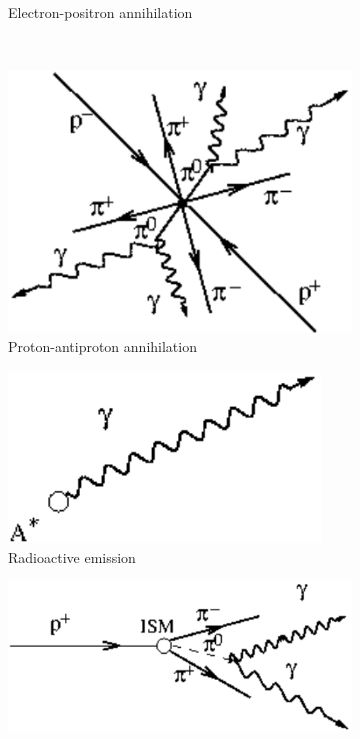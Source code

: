 \documentclass[main.tex]{subfiles}
\begin{document}
\begin{figure}[h]
\begin{subfigure}{0.31\textwidth}
\caption{Electron-positron annihilation} \label{fig:1f} 
\end{subfigure}
\\
\begin{subfigure}{0.31\textwidth}
\includegraphics[width=\linewidth]{Pictures/protonantiproton.pdf}
\caption{Proton-antiproton annihilation} \label{fig:1g}
\end{subfigure}
\hspace*{\fill} %
\begin{subfigure}{0.31\textwidth}
\includegraphics[width=\linewidth]{Pictures/radioactiveemission.pdf}
\caption{Radioactive emission} \label{fig:1h}
\end{subfigure}
\hspace*{\fill} %
\begin{subfigure}{0.31\textwidth}
\includegraphics[width=\linewidth]{Pictures/hadrocollision.pdf}

\end{subfigure}
\end{figure}
\end{document}
